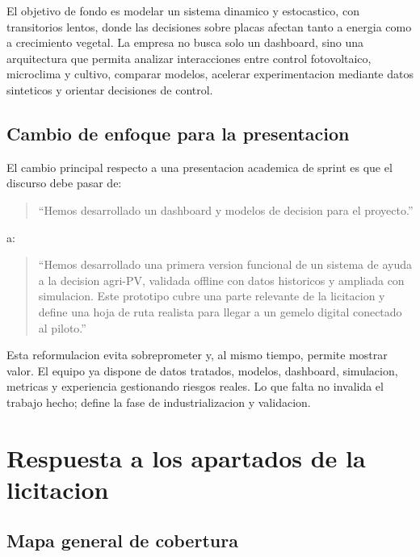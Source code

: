 ﻿\documentclass[11pt,a4paper]{article}
\begin{document}
El objetivo de fondo es modelar un sistema dinamico y estocastico, con transitorios lentos, donde las decisiones sobre placas afectan tanto a energia como a crecimiento vegetal. La empresa no busca solo un dashboard, sino una arquitectura que permita analizar interacciones entre control fotovoltaico, microclima y cultivo, comparar modelos, acelerar experimentacion mediante datos sinteticos y orientar decisiones de control.

\subsection{Cambio de enfoque para la presentacion}

El cambio principal respecto a una presentacion academica de sprint es que el discurso debe pasar de:

\begin{quote}
``Hemos desarrollado un dashboard y modelos de decision para el proyecto.''
\end{quote}

a:

\begin{quote}
``Hemos desarrollado una primera version funcional de un sistema de ayuda a la decision agri-PV, validada offline con datos historicos y ampliada con simulacion. Este prototipo cubre una parte relevante de la licitacion y define una hoja de ruta realista para llegar a un gemelo digital conectado al piloto.''
\end{quote}

Esta reformulacion evita sobreprometer y, al mismo tiempo, permite mostrar valor. El equipo ya dispone de datos tratados, modelos, dashboard, simulacion, metricas y experiencia gestionando riesgos reales. Lo que falta no invalida el trabajo hecho; define la fase de industrializacion y validacion.

\newpage

\section{Respuesta a los apartados de la licitacion}

\subsection{Mapa general de cobertura}
\end{document}
